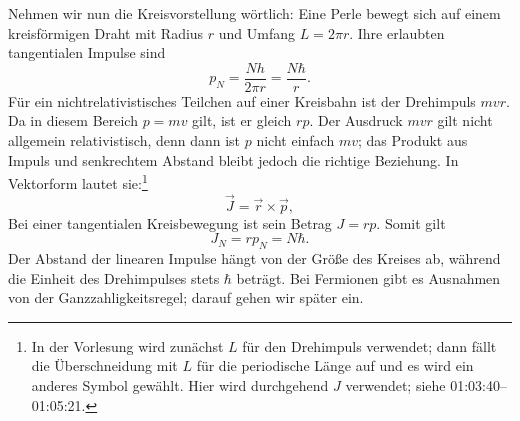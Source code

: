 \begin{classroomqa}\end{classroomqa}

\begin{classroomqa}\end{classroomqa}

\begin{classroomqa}\end{classroomqa}

Nehmen wir nun die Kreisvorstellung wörtlich: Eine Perle bewegt sich auf einem kreisförmigen Draht mit Radius \(r\) und Umfang \(L=2\pi r\). Ihre erlaubten tangentialen Impulse sind
\begin{equation}
p_N=\frac{Nh}{2\pi r}=\frac{N\hbar}{r}.
\end{equation}
Für ein nichtrelativistisches Teilchen auf einer Kreisbahn ist der Drehimpuls \(mvr\). Da in diesem Bereich \(p=mv\) gilt, ist er gleich \(rp\). Der Ausdruck \(mvr\) gilt nicht allgemein relativistisch, denn dann ist \(p\) nicht einfach \(mv\); das Produkt aus Impuls und senkrechtem Abstand bleibt jedoch die richtige Beziehung. In Vektorform lautet sie:\footnote{In der Vorlesung wird zunächst \(L\) für den Drehimpuls verwendet; dann fällt die Überschneidung mit \(L\) für die periodische Länge auf und es wird ein anderes Symbol gewählt. Hier wird durchgehend \(J\) verwendet; siehe 01:03:40--01:05:21.}
\begin{equation}
\vec J=\vec r\times\vec p,
\end{equation}
Bei einer tangentialen Kreisbewegung ist sein Betrag \(J=rp\). Somit gilt
\begin{equation}
J_N=rp_N=N\hbar.
\end{equation}
Der Abstand der linearen Impulse hängt von der Größe des Kreises ab, während die Einheit des Drehimpulses stets \(\hbar\) beträgt. Bei Fermionen gibt es Ausnahmen von der Ganzzahligkeitsregel; darauf gehen wir später ein.

